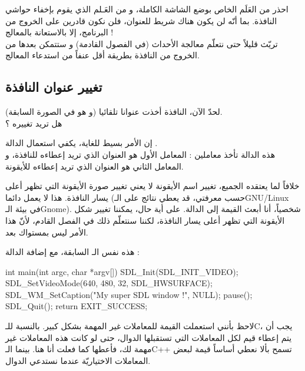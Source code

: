 \begin{warning}
احذر من العَلَم 
الخاص بوضع الشاشة الكاملة، و من العَـلم 
الذي يقوم بإخفاء حواشي النافذة. بما أنّه لن يكون هناك شريط للعنوان، فلن نكون قادرين على الخروج من البرنامج، إلا بالاستعانة بالمعالج !\\
تريّث قليلاً حتى نتعلّم معالجة الأحداث (في الفصول القادمة) و ستتمكن بعدها من الخروج من النافذة بطريقة أقل عنفاً من استدعاء المعالج.
\end{warning}

\subsection{تغيير عنوان النافذة}

لحدّ الآن، النافذة أخذت عنوانا تلقائيا (و هو 
في الصورة السابقة).\\
هل تريد تغييره ؟

إن الأمر بسيط للغاية، يكفي استعمال الدالة
.\\
هذه الدالة تأخذ معاملين : المعامل الأول هو العنوان الذي تريد إعطاءه للنافذة، و المعامل الثاني هو العنوان الذي تريد إعطاءه للأيقونة.

خلافاً لما يعتقده الجميع، تغيير اسم الأيقونة لا يعني تغيير صورة الأيقونة التي تظهر أعلى يسار النافذة. هذا لا يعمل دائما (حسب معرفتي، قد يعطي نتائج على الـ\textenglish{GNU/Linux}
في بيئة الـ\textenglish{Gnome}).
شخصياً، أنا أبعث القيمة
إلى الدالة. على أية حال، يمكننا تغيير شكل الأيقونة التي تظهر أعلى يسار النافذة، لكننا سنتعلّم ذلك في الفصل القادم، لأنّ هذا الأمر ليس بمستواك بعد.

هذه نفس الـ
السابقة، مع إضافة الدالة
 :

\begin{Csource}
int main(int argc, char *argv[])
{
	SDL_Init(SDL_INIT_VIDEO);
	SDL_SetVideoMode(640, 480, 32, SDL_HWSURFACE);
	SDL_WM_SetCaption("My super SDL window !", NULL);
	pause();
	SDL_Quit();
	return EXIT_SUCCESS;
}
\end{Csource}

\begin{information}
لاحظ بأنني استعملت القيمة 
للمعاملات غير المهمة بشكل كبير. بالنسبة للـ\textenglish{C}،
يجب أن يتم إعطاء قيم لكل المعاملات التي تستقبلها الدوال، حتى لو كانت هذه المعاملات غير مهمة لك، فأعطها
كما فعلت أنا هنا. بينما الـ\textenglish{C++}
تسمح بألا نعطي أساساً قيمة لبعض المعاملات الاختياريّة عندما نستدعي الدوال.
\end{information}

